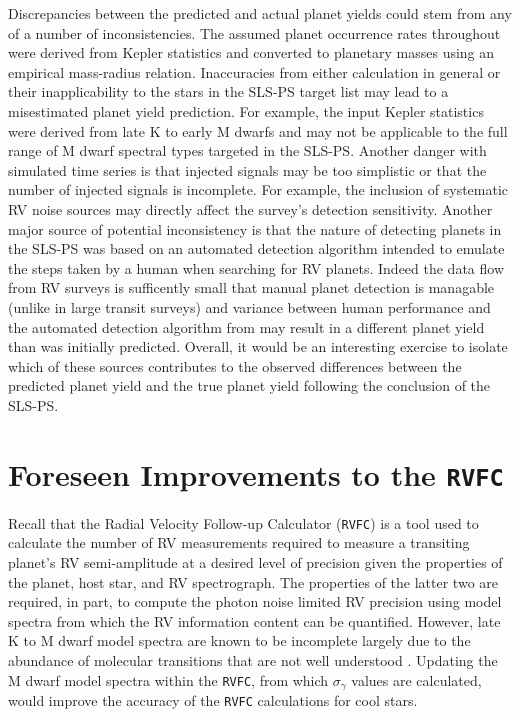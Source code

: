 Discrepancies between the predicted and actual planet yields could stem
from any of a number of inconsistencies. The assumed planet occurrence rates
throughout were derived from Kepler statistics and converted to planetary masses
using an empirical mass-radius relation. Inaccuracies from either calculation
in general or their inapplicability to the stars in the SLS-PS target list may
lead to a misestimated planet yield prediction. For example, the input Kepler
statistics were derived from late K to early M dwarfs \citep{dressing15a} and
may not be applicable to the full range of M dwarf spectral types targeted in
the SLS-PS. Another danger with simulated time series is that injected signals
may be too simplistic or that the number of injected signals is incomplete. For
example, the inclusion of systematic RV noise sources may directly affect the
survey's detection sensitivity. Another major source of potential inconsistency
is that the nature of detecting planets in the SLS-PS was based on an automated
detection algorithm intended to emulate the steps taken by a human when
searching for RV planets. Indeed the data flow from RV surveys is sufficently
small that manual planet detection is managable (unlike in large transit
surveys) and variance between human performance and the automated detection
algorithm from \cite{cloutier18a} may result in a different planet yield than
was initially predicted. Overall, it would be an interesting exercise to
isolate which of these sources contributes to the observed differences between
the predicted planet yield and the true planet yield following the conclusion
of the SLS-PS.

\section{Foreseen Improvements to the \texttt{RVFC}}
Recall that the Radial Velocity Follow-up Calculator (\texttt{RVFC}) is a tool
used to calculate the number of RV measurements required to measure a transiting
planet's RV semi-amplitude at a desired level of precision given the properties
of the planet, host star, and RV spectrograph. The properties of the latter two
are required, in part, to compute the photon noise limited RV precision using
model spectra from which the RV information content can be quantified. However,
late K to M dwarf model spectra are known to be incomplete largely due to the
abundance of molecular transitions that are not well understood
\citep{passegger16,behmard19}. Updating the M dwarf model spectra within the
\texttt{RVFC}, from which $\sigma_{\gamma}$ values are calculated, would improve
the accuracy of the \texttt{RVFC} calculations for cool stars. \\

